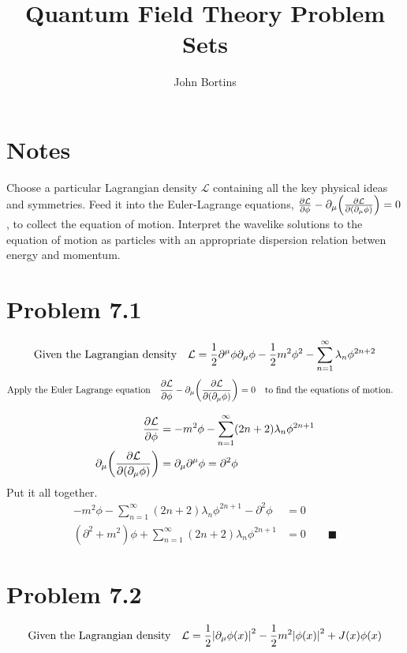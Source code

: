 \documentclass{article}
\title{Quantum Field Theory Problem Sets}
\author{John Bortins}
\begin{document}
 
\maketitle{}

\section*{Notes}

Choose a particular Lagrangian density $\mathcal{L}$ containing all the key physical ideas and symmetries. Feed it into the Euler-Lagrange equations, $\pdv{\mathcal{L}}{\phi}-\partial_{\mu} \qty(\pdv{\mathcal{L}}{\qty(\partial_{\mu}\phi)})=0$, to collect the equation of motion. Interpret the wavelike solutions to the equation of motion as particles with an appropriate dispersion relation betwen energy and momentum.

\section*{Problem 7.1}



\[ \qq*{Given the Lagrangian density} \mathcal{L}=\frac{1}{2}\partial^{\mu}\phi\partial_{\mu}\phi-\frac{1}{2}m^2\phi^2-\sum_{n=1}^{\infty} \lambda_n \phi^{2n+2} \]
\[ \qq*{Apply the Euler Lagrange equation} \pdv{\mathcal{L}}{\phi}-\partial_{\mu} \qty(\pdv{\mathcal{L}}{\qty(\partial_{\mu}\phi)})=0\qq{to find the equations of motion.} \]

\begin{align*}
\pdv{\mathcal{L}}{\phi}&=-m^2 \phi-\sum_{n=1}^{\infty} (2n+2)\lambda_n \phi^{2n+1}\\
\partial_{\mu} \qty(\pdv{\mathcal{L}}{\qty(\partial_{\mu}\phi)})&=\partial_{\mu}\partial^{\mu}\phi=\partial^2 \phi
\end{align*}
Put it all together.
\begin{align*}
-m^2 \phi-\sum_{n=1}^{\infty} (2n+2)\lambda_n \phi^{2n+1}-\partial^2 \phi &=0 \\
(\partial^2 +m^2)\phi+\sum_{n=1}^{\infty} (2n+2)\lambda_n \phi^{2n+1}&=0\qquad\blacksquare
\end{align*}


\section*{Problem 7.2}



\[ \qq*{Given the Lagrangian density} \mathcal{L}=\frac{1}{2}\qty|\partial_{\mu}\phi(x)|^2-\frac{1}{2}m^2\qty|\phi(x)|^2+J(x)\phi(x) \]
\end{document}
